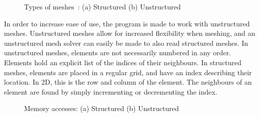 \begin{figure}[H]
	\centering
	\hfill
	\caption{Types of meshes~\cite{Clucas1999}: (a) Structured (b) Unstructured}
	\label{fig:mesh_types}
\end{figure}

In order to increase ease of use, the program is made to work with unstructured meshes. Unstructured
meshes allow for increased flexibility when meshing, and an unstructured mesh solver can easily be
made to also read structured meshes. In unstructured meshes, elements are not necessarily numbered
in any order. Elements hold an explicit list of the indices of their neighbours. In structured
meshes, elements are placed in a regular grid, and have an index describing their location. In 2D,
this is the row and column of the element. The neighbours of an element are found by simply
incrementing or decrementing the index.

\begin{figure}[H]
	\centering
	\hfill
	\caption{Memory accesses: (a) Structured (b) Unstructured}
	\label{fig:mesh_memory}
\end{figure}

